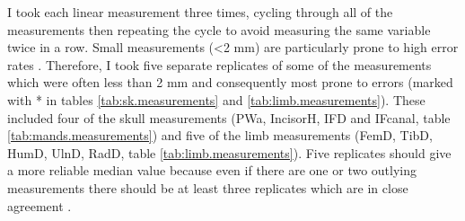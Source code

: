 	I took each linear measurement three times, cycling through all of the measurements then repeating the cycle to avoid measuring the same variable twice in a row. Small measurements (<2 mm) are particularly prone to high error rates \citep{Cardini2008}. Therefore, I took five separate replicates of some of the measurements which were often less than 2 mm and consequently most prone to errors (marked with * in tables \ref{tab:sk.measurements} and \ref{tab:limb.measurements}). These included four of the skull measurements (PWa, IncisorH, IFD and IFcanal, table \ref{tab:mands.measurements}) and five of the limb measurements (FemD, TibD, HumD, UlnD, RadD, table \ref{tab:limb.measurements}). 
	Five replicates should give a more reliable median value because even if there are one or two outlying measurements there should be at least three replicates which are in close agreement \citep{Cooper2009}.

